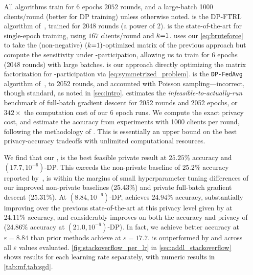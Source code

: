 \documentclass{article} %
\theoremstyle{named}
\begin{document}
\vspace{-0.5em} %
 All algorithms train for $6$ epochs $2052$ rounds, and a large-batch 1000 clients/round (better for DP training) unless otherwise noted. \Honaker is the DP-FTRL algorithm of~\citet{kairouz2021practical}, trained for 2048 rounds (a power of 2). \OneEpochOne \citep{denisov22matfact} is the state-of-the-art for single-epoch training, using $167$ clients/round and $k{=}1$. \OneEpochSix uses our \cref{eq:bruteforce} to take the (non-negative) $(k{=}1)$-optimized matrix of the previous approach but compute the sensitivity under -participation, allowing us to train for 6 epochs (2048 rounds) with large batches. \SixEpoch is our approach directly optimizing the matrix factorization for -participation via \cref{eq:symmetrized_problem}. \DPSGDSix is the \texttt{DP-FedAvg} algorithm of~\citet{mcmahan2017learning}, to 2052 rounds, and accounted with Poisson sampling---incorrect, though standard, as noted in \cref{sec:intro}. \DPGD estimates the \emph{infeasible-to-actually-run} benchmark of full-batch gradient descent for 2052 rounds and 2052 epochs, or $342\times$ the computation cost of our 6 epoch runs. We compute the exact privacy cost, and estimate the accuracy from experiments with 1000 clients per round, following the methodology of \citet{kairouz2021practical}. This is essentially an upper bound on the best privacy-accuracy tradeoffs with unlimited computational resources.


\vspace{-0.5em}
\newcommand{\epsdelta}[1]{$(#1, 10^{-6})$-DP}
We find that our \SixEpoch, is the best feasible private result at $25.25\%$ accuracy and \epsdelta{17.7}. This exceeds the non-private baseline of $25.2\%$ accuracy reported by~\citet{kairouz2021practical}, is within the margins of small hyperparameter tuning differences of our improved non-private baselines (25.43\%) and private full-batch gradient descent ($25.31\%$).
At \epsdelta{8.84}, \SixEpoch achieves $24.94\%$ accuracy, substantially improving over the previous state-of-the-art at this privacy level given by \OneEpochOne at $24.11\%$ accuracy, and considerably improves on both the accuracy and privacy of \Honaker ($24.86\%$ accuracy at \epsdelta{21.0}). In fact, we achieve better accuracy at $\varepsilon=8.84$ than prior methods achieve at $\varepsilon=17.7$. \DPSGDSix is outperformed by \SixEpoch and \OneEpochSix across all $\varepsilon$ values evaluated. \cref{fig:stackoverflow_per_lr} in \cref{sec:addl_stackoverflow} shows results for each learning rate separately, with numeric results in \cref{tab:mf,tab:sgd}.
\end{document}
